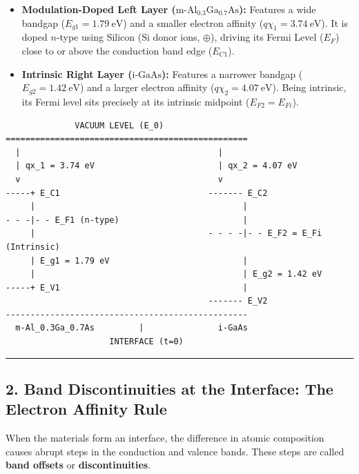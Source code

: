 \documentclass[
]{article}
\providecommand{\tightlist}{%
  \setlength{\itemsep}{0pt}\setlength{\parskip}{0pt}}
\begin{document}
\begin{itemize}
\tightlist
\item
  \textbf{Modulation-Doped Left Layer
  (\(\text{m-Al}_{0.3}\text{Ga}_{0.7}\text{As}\)):} Features a wide
  bandgap (\(E_{g1} = 1.79\ \text{eV}\)) and a smaller electron affinity
  (\(q\chi_1 = 3.74\ \text{eV}\)). It is doped \(n\)-type using Silicon
  (\(\text{Si}\) donor ions, \(\oplus\)), driving its Fermi Level
  (\(E_F\)) close to or above the conduction band edge (\(E_{C1}\)).
\item
  \textbf{Intrinsic Right Layer (\(\text{i-GaAs}\)):} Features a
  narrower bandgap (\(E_{g2} = 1.42\ \text{eV}\)) and a larger electron
  affinity (\(q\chi_2 = 4.07\ \text{eV}\)). Being intrinsic, its Fermi
  level sits precisely at its intrinsic midpoint (\(E_{F2} = E_{Fi}\)).
\end{itemize}

\begin{verbatim}
              VACUUM LEVEL (E_0)
=================================================
  |                                        |
  | qx_1 = 3.74 eV                         | qx_2 = 4.07 eV
  v                                        v
-----+ E_C1                              ------- E_C2
     |                                          |
- - -|- - E_F1 (n-type)                         |
     |                                   - - - -|- - E_F2 = E_Fi (Intrinsic)
     | E_g1 = 1.79 eV                           |
     |                                          | E_g2 = 1.42 eV
-----+ E_V1                                     |
                                         ------- E_V2
-------------------------------------------------
  m-Al_0.3Ga_0.7As         |               i-GaAs
                     INTERFACE (t=0)
\end{verbatim}

\begin{center}\rule{0.5\linewidth}{0.5pt}\end{center}

\subsection{2. Band Discontinuities at the Interface: The Electron
Affinity
Rule}\label{band-discontinuities-at-the-interface-the-electron-affinity-rule}

When the materials form an interface, the difference in atomic
composition causes abrupt steps in the conduction and valence bands.
These steps are called \textbf{band offsets} or
\textbf{discontinuities}.
\end{document}
